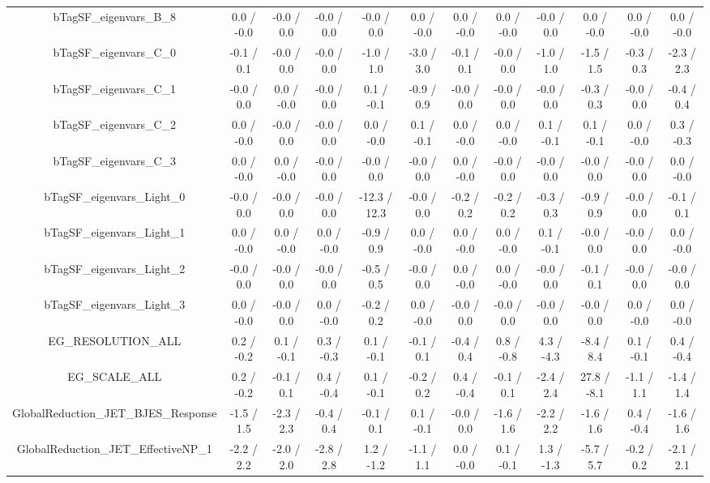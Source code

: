 \begin{table}[htbp]
\begin{center}
\begin{tabular}{|c|c|c|c|c|c|c|c|c|c|c|c|}
  bTagSF_eigenvars_B_8 & 0.0 / -0.0 & -0.0 / 0.0 & -0.0 / 0.0 & -0.0 / 0.0 & 0.0 / -0.0 & 0.0 / -0.0 & 0.0 / -0.0 & -0.0 / 0.0 & 0.0 / -0.0 & 0.0 / -0.0 & 0.0 / -0.0 \\ 
  bTagSF_eigenvars_C_0 & -0.1 / 0.1 & -0.0 / 0.0 & -0.0 / 0.0 & -1.0 / 1.0 & -3.0 / 3.0 & -0.1 / 0.1 & -0.0 / 0.0 & -1.0 / 1.0 & -1.5 / 1.5 & -0.3 / 0.3 & -2.3 / 2.3 \\ 
  bTagSF_eigenvars_C_1 & -0.0 / 0.0 & 0.0 / -0.0 & -0.0 / 0.0 & 0.1 / -0.1 & -0.9 / 0.9 & -0.0 / 0.0 & -0.0 / 0.0 & -0.0 / 0.0 & -0.3 / 0.3 & -0.0 / 0.0 & -0.4 / 0.4 \\ 
  bTagSF_eigenvars_C_2 & 0.0 / -0.0 & -0.0 / 0.0 & -0.0 / 0.0 & 0.0 / -0.0 & 0.1 / -0.1 & 0.0 / -0.0 & 0.0 / -0.0 & 0.1 / -0.1 & 0.1 / -0.1 & 0.0 / -0.0 & 0.3 / -0.3 \\ 
  bTagSF_eigenvars_C_3 & 0.0 / -0.0 & 0.0 / -0.0 & -0.0 / 0.0 & -0.0 / 0.0 & -0.0 / 0.0 & 0.0 / -0.0 & -0.0 / 0.0 & -0.0 / 0.0 & -0.0 / 0.0 & -0.0 / 0.0 & 0.0 / -0.0 \\ 
  bTagSF_eigenvars_Light_0 & -0.0 / 0.0 & -0.0 / 0.0 & -0.0 / 0.0 & -12.3 / 12.3 & -0.0 / 0.0 & -0.2 / 0.2 & -0.2 / 0.2 & -0.3 / 0.3 & -0.9 / 0.9 & -0.0 / 0.0 & -0.1 / 0.1 \\ 
  bTagSF_eigenvars_Light_1 & 0.0 / -0.0 & 0.0 / -0.0 & 0.0 / -0.0 & -0.9 / 0.9 & 0.0 / -0.0 & 0.0 / -0.0 & 0.0 / -0.0 & 0.1 / -0.1 & -0.0 / 0.0 & -0.0 / 0.0 & 0.0 / -0.0 \\ 
  bTagSF_eigenvars_Light_2 & -0.0 / 0.0 & -0.0 / 0.0 & -0.0 / 0.0 & -0.5 / 0.5 & -0.0 / 0.0 & 0.0 / -0.0 & 0.0 / -0.0 & -0.0 / 0.0 & -0.1 / 0.1 & -0.0 / 0.0 & -0.0 / 0.0 \\ 
  bTagSF_eigenvars_Light_3 & 0.0 / -0.0 & -0.0 / 0.0 & 0.0 / -0.0 & -0.2 / 0.2 & 0.0 / -0.0 & -0.0 / 0.0 & -0.0 / 0.0 & -0.0 / 0.0 & -0.0 / 0.0 & 0.0 / -0.0 & 0.0 / -0.0 \\ 
  EG_RESOLUTION_ALL & 0.2 / -0.2 & 0.1 / -0.1 & 0.3 / -0.3 & 0.1 / -0.1 & -0.1 / 0.1 & -0.4 / 0.4 & 0.8 / -0.8 & 4.3 / -4.3 & -8.4 / 8.4 & 0.1 / -0.1 & 0.4 / -0.4 \\ 
  EG_SCALE_ALL & 0.2 / -0.2 & -0.1 / 0.1 & 0.4 / -0.4 & 0.1 / -0.1 & -0.2 / 0.2 & 0.4 / -0.4 & -0.1 / 0.1 & -2.4 / 2.4 & 27.8 / -8.1 & -1.1 / 1.1 & -1.4 / 1.4 \\ 
  GlobalReduction_JET_BJES_Response & -1.5 / 1.5 & -2.3 / 2.3 & -0.4 / 0.4 & -0.1 / 0.1 & 0.1 / -0.1 & -0.0 / 0.0 & -1.6 / 1.6 & -2.2 / 2.2 & -1.6 / 1.6 & 0.4 / -0.4 & -1.6 / 1.6 \\ 
  GlobalReduction_JET_EffectiveNP_1 & -2.2 / 2.2 & -2.0 / 2.0 & -2.8 / 2.8 & 1.2 / -1.2 & -1.1 / 1.1 & 0.0 / -0.0 & 0.1 / -0.1 & 1.3 / -1.3 & -5.7 / 5.7 & -0.2 / 0.2 & -2.1 / 2.1 \\ 

\end{tabular}
\end{center}
\end{table}
